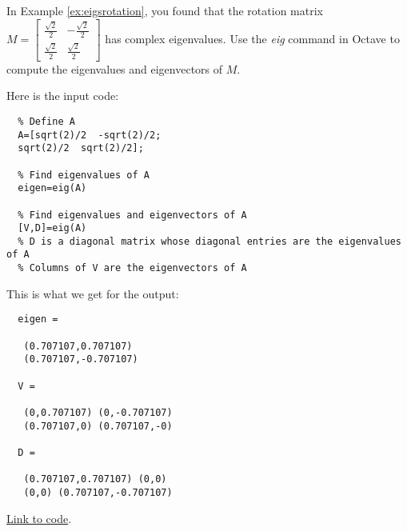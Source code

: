 \documentclass{ximera}
\begin{document}
  \begin{example}\label{ex:complexEig}
  In Example \ref{ex:eigsrotation}, you found that the rotation matrix $M=\begin{bmatrix}
  \frac{\sqrt{2}}{2} & -\frac{\sqrt{2}}{2}\\
  \frac{\sqrt{2}}{2} & \frac{\sqrt{2}}{2}
  \end{bmatrix}$ has complex eigenvalues.  Use the \emph{eig} command in Octave to compute the eigenvalues and eigenvectors of $M$.  
  
  \begin{explanation}
  Here is the input code:
  
  \begin{verbatim}
  % Define A
  A=[sqrt(2)/2  -sqrt(2)/2;
  sqrt(2)/2  sqrt(2)/2];
  
  % Find eigenvalues of A
  eigen=eig(A)
  
  % Find eigenvalues and eigenvectors of A
  [V,D]=eig(A)
  % D is a diagonal matrix whose diagonal entries are the eigenvalues of A
  % Columns of V are the eigenvectors of A
  \end{verbatim}
  
  This is what we get for the output:
  \begin{verbatim}
  eigen =
  
   (0.707107,0.707107)
   (0.707107,-0.707107)
  
  V =
  
   (0,0.707107) (0,-0.707107)
   (0.707107,0) (0.707107,-0)
  
  D =
  
   (0.707107,0.707107) (0,0)
   (0,0) (0.707107,-0.707107) 

  \end{verbatim}
  
  \href{https://sagecell.sagemath.org/?z=eJx1jkEKgzAURPeB3GE2AYWWgtviQio9ghtxEepXAzHBGNsev1FoKqXdfOY_ZoYRKKlThlBwVuT1PDmfZOkpA45Rnznb8SibwDkTuCrTglRP5i71QjNst7ZtJA83KdI_Rhl_unnr3sm6OpRNTAqUUMGLVsneGqkxSu_UE4_BzvShZAJdSx3BD_RjkcDF6mU02199GXcLXu8oVg4=&lang=octave&interacts=eJyLjgUAARUAuQ==}{Link to code}.
  

\end{explanation}
\end{example}
\end{document}
